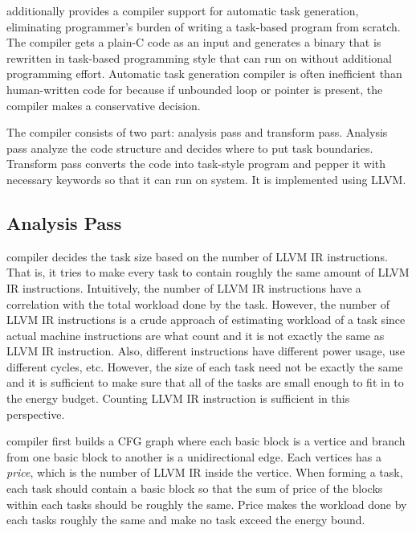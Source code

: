 \sys additionally provides a compiler support for automatic task
generation, eliminating programmer's burden of writing a task-based
program from scratch. The compiler gets a plain-C code as an input
and generates a binary that is rewritten in task-based programming
style that can run on \sys without additional programming effort. 
Automatic task generation compiler is often inefficient than human-written
code for \sys because if unbounded loop or pointer is present, the
compiler makes a conservative decision. 

The compiler consists of two part: analysis pass and transform pass.
Analysis pass analyze the code structure and decides where to put
task boundaries. Transform pass converts the code into task-style
program and pepper it with necessary \sys keywords so that it can run
on \sys system. It is implemented using LLVM.

\subsection{Analysis Pass}
\label{sec:analysis}

\sys compiler decides the task size based on the number of LLVM IR instructions.
That is, it tries to make every task to contain roughly the same amount of LLVM IR
instructions. Intuitively, the number of LLVM IR instructions have a correlation with
the total workload done by the task. However, the number of LLVM IR instructions is 
a crude approach of estimating workload of a task since actual machine instructions are
what count and it is not exactly the same as LLVM IR instruction. Also, different instructions
have different power usage, use different cycles, etc. However, the size of each
task need not be exactly the same and it is sufficient to make sure that all of the
tasks are small enough to fit in to the energy budget. Counting LLVM IR instruction is sufficient
in this perspective.

\sys compiler first builds a CFG graph where each basic block is a vertice and branch
from one basic block to another is a unidirectional edge. Each vertices has a
{\em price}, which is the number of LLVM IR inside the vertice. 
When forming a task, each task should contain a basic block so that the sum of price of the 
blocks within each tasks should be roughly the same. Price makes the workload done by
each tasks roughly the same and make no task exceed the energy bound.

